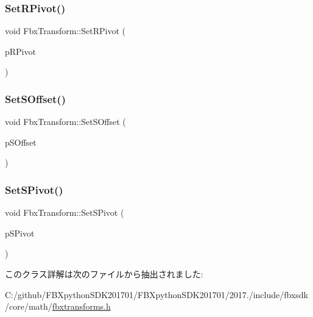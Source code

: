 \mbox{\label{class_fbx_transform_a0c4646271d2b4205288c6dc2200fc57b}} 
\subsubsection{\texorpdfstring{Set\+R\+Pivot()}{SetRPivot()}}
{\footnotesize\ttfamily void Fbx\+Transform\+::\+Set\+R\+Pivot (\begin{DoxyParamCaption}\item[{const \hyperlink{class_fbx_vector4}{Fbx\+Vector4} \&}]{p\+R\+Pivot }\end{DoxyParamCaption})}

\mbox{\label{class_fbx_transform_a62c43ef5f9f11e06b88649ed0dd3b4b5}} 
\subsubsection{\texorpdfstring{Set\+S\+Offset()}{SetSOffset()}}
{\footnotesize\ttfamily void Fbx\+Transform\+::\+Set\+S\+Offset (\begin{DoxyParamCaption}\item[{const \hyperlink{class_fbx_vector4}{Fbx\+Vector4} \&}]{p\+S\+Offset }\end{DoxyParamCaption})}

\mbox{\label{class_fbx_transform_a7a7084f9afd2f102f8db147e4b1c1583}} 
\subsubsection{\texorpdfstring{Set\+S\+Pivot()}{SetSPivot()}}
{\footnotesize\ttfamily void Fbx\+Transform\+::\+Set\+S\+Pivot (\begin{DoxyParamCaption}\item[{const \hyperlink{class_fbx_vector4}{Fbx\+Vector4} \&}]{p\+S\+Pivot }\end{DoxyParamCaption})}



このクラス詳解は次のファイルから抽出されました\+:\begin{DoxyCompactItemize}
\item 
C\+:/github/\+F\+B\+Xpython\+S\+D\+K201701/\+F\+B\+Xpython\+S\+D\+K201701/2017./include/fbxsdk/core/math/\hyperlink{fbxtransforms_8h}{fbxtransforms.\+h}\end{DoxyCompactItemize}
